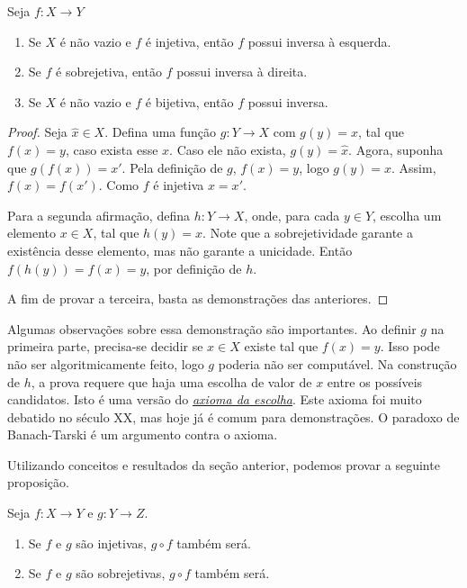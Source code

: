 \begin{theorem}
    \label{prop6}
    Seja $f: X \to Y$
    \renewcommand{\labelenumi}{\Roman{enumi}}
    \begin{enumerate}
        \item Se $X$ é não vazio e $f$ é injetiva, então $f$ possui inversa à esquerda.
        \item Se $f$ é sobrejetiva, então $f$ possui inversa à direita.
        \item Se $X$ é não vazio e $f$ é bijetiva, então $f$ possui inversa.
    \end{enumerate}
\end{theorem}

\begin{proof}
    Seja $\hat{x} \in X$. Defina uma função $g: Y \to X$ com $g(y) = x$, tal que $f(x) = y$,
    caso exista esse $x$. Caso ele não exista, $g(y) = \hat{x}$. Agora, suponha que
    $g(f(x)) = x'$. Pela definição de $g$, $f(x) = y$, logo $g(y) = x$. Assim, $f(x) = f(x')$.
    Como $f$ é injetiva $x = x'$.

    Para a segunda afirmação, defina $h: Y \to X$, onde, para cada $y \in Y$, escolha um elemento
    $x \in X$, tal que $h(y) = x$. Note que a sobrejetividade garante a existência desse elemento,
    mas não garante a unicidade. Então $f(h(y)) = f(x) = y$, por definição de $h$.

    A fim de provar a terceira, basta as demonstrações das anteriores.
\end{proof}

Algumas observações sobre essa demonstração são importantes. Ao definir $g$ na primeira parte,
precisa-se decidir se $x \in X$ existe tal que $f(x) = y$. Isso pode não ser algoritmicamente
feito, logo $g$ poderia não ser computável. Na construção de $h$, a prova requere que haja
uma escolha de valor de $x$ entre os possíveis candidatos. Isto é uma versão do
\href{https://pt.wikipedia.org/wiki/Axioma_da_escolha#Enunciado}{\textit{axioma da escolha}}.
Este axioma foi muito debatido no século XX, mas hoje já é comum para demonstrações. O paradoxo
de Banach-Tarski é um argumento contra o axioma.

Utilizando conceitos e resultados da seção anterior, podemos provar a seguinte proposição.

\begin{theorem}
    Seja $f: X \to Y$ e $g: Y \to Z$.
    \renewcommand{\labelenumi}{\Roman{enumi}}
    \begin{enumerate}
        \item Se $f$ e $g$ são injetivas, $g \circ f$ também será.
        \item Se $f$ e $g$ são sobrejetivas, $g \circ f$ também será.
    \end{enumerate}
\end{theorem}

